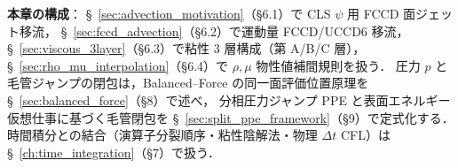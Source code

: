\noindent\textbf{本章の構成}：
\S~\ref{sec:advection_motivation}（§6.1）で CLS $\psi$ 用 FCCD 面ジェット移流，
\S~\ref{sec:fccd_advection}（§6.2）で運動量 FCCD/UCCD6 移流，
\S~\ref{sec:viscous_3layer}（§6.3）で粘性 3 層構成（第 A/B/C 層），
\S~\ref{sec:rho_mu_interpolation}（§6.4）で $\rho,\mu$ 物性値補間規則を扱う．
圧力 $p$ と毛管ジャンプの閉包は，Balanced--Force の同一面評価位置原理を
\S~\ref{sec:balanced_force}（§8）で述べ，
分相圧力ジャンプ PPE と表面エネルギー仮想仕事に基づく毛管閉包を
\S~\ref{sec:split_ppe_framework}（§9）で定式化する．
時間積分との結合（演算子分裂順序・粘性陰解法・物理 $\Delta t$ CFL）は
\S~\ref{ch:time_integration}（§7）で扱う．


